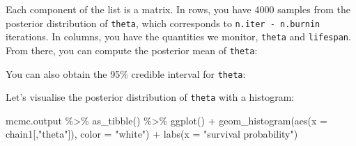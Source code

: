 \documentclass[
  12pt,
]{krantz}
\newenvironment{Shaded}{\begin{snugshade}}{\end{snugshade}}
\newcommand{\AttributeTok}[1]{\textcolor[rgb]{0.77,0.63,0.00}{#1}}
\newcommand{\DecValTok}[1]{\textcolor[rgb]{0.00,0.00,0.81}{#1}}
\newcommand{\DocumentationTok}[1]{\textcolor[rgb]{0.56,0.35,0.01}{\textbf{\textit{#1}}}}
\newcommand{\FloatTok}[1]{\textcolor[rgb]{0.00,0.00,0.81}{#1}}
\newcommand{\FunctionTok}[1]{\textcolor[rgb]{0.00,0.00,0.00}{#1}}
\newcommand{\NormalTok}[1]{#1}
\newcommand{\SpecialCharTok}[1]{\textcolor[rgb]{0.00,0.00,0.00}{#1}}
\newcommand{\StringTok}[1]{\textcolor[rgb]{0.31,0.60,0.02}{#1}}
\begin{document}
Each component of the list is a matrix. In rows, you have 4000 samples from the posterior distribution of \texttt{theta}, which corresponds to \texttt{n.iter\ -\ n.burnin} iterations. In columns, you have the quantities we monitor, \texttt{theta} and \texttt{lifespan}. From there, you can compute the posterior mean of \texttt{theta}:

\begin{Shaded}
\end{Shaded}

You can also obtain the 95\% credible interval for \texttt{theta}:

\begin{Shaded}
\end{Shaded}

Let's visualise the posterior distribution of \texttt{theta} with a histogram:

\begin{Shaded}
\begin{Highlighting}[]
\NormalTok{mcmc.output }\SpecialCharTok{\%\textgreater{}\%}
  \FunctionTok{as\_tibble}\NormalTok{() }\SpecialCharTok{\%\textgreater{}\%}
  \FunctionTok{ggplot}\NormalTok{() }\SpecialCharTok{+}
  \FunctionTok{geom\_histogram}\NormalTok{(}\FunctionTok{aes}\NormalTok{(}\AttributeTok{x =}\NormalTok{ chain1[,}\StringTok{"theta"}\NormalTok{]), }\AttributeTok{color =} \StringTok{"white"}\NormalTok{) }\SpecialCharTok{+}
  \FunctionTok{labs}\NormalTok{(}\AttributeTok{x =} \StringTok{"survival probability"}\NormalTok{)}
\end{Highlighting}
\end{Shaded}
\end{document}
